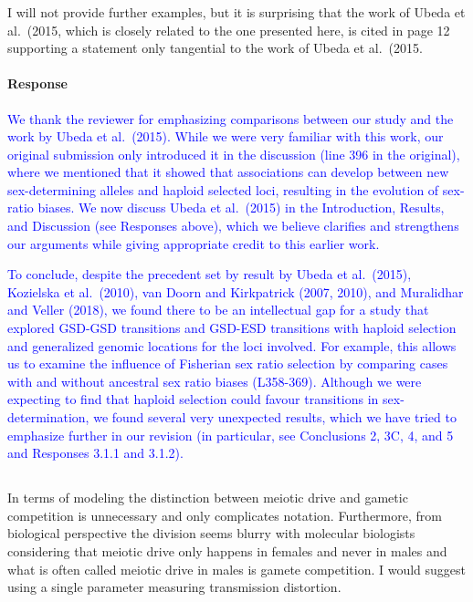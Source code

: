 \documentclass[10pt,letterpaper]{article}
\begin{document}
\noindent\subsubsection{}
I will not provide further examples, but it is surprising that the work of Ubeda et al.\ (2015, which is closely related to the one presented here, is cited in page 12 supporting a statement only tangential to the work of Ubeda et al.\ (2015.

\noindent\paragraph{Response}
\textcolor{blue}{
We thank the reviewer for emphasizing comparisons between our study and the work by Ubeda et al.\ (2015). 
While we were very familiar with this work, our original submission only introduced it in the discussion (line 396 in the original), where we mentioned that it showed that associations can develop between new sex-determining alleles and haploid selected loci, resulting in the evolution of sex-ratio biases.
We now discuss Ubeda et al.\ (2015) in the Introduction, Results, and Discussion (see Responses above), which we believe clarifies and strengthens our arguments while giving appropriate credit to this earlier work.
}

\textcolor{blue}{To conclude, despite the precedent set by result by Ubeda et al.\ (2015), Kozielska et al.\ (2010), van Doorn and Kirkpatrick (2007, 2010), and Muralidhar and Veller (2018), we found there to be an intellectual gap for a study that explored GSD-GSD transitions and GSD-ESD transitions with haploid selection and generalized genomic locations for the loci involved. 
For example, this allows us to examine the influence of Fisherian sex ratio selection by comparing cases with and without ancestral sex ratio biases (L358-369). 
Although we were expecting to find that haploid selection could favour transitions in sex-determination, we found several very unexpected results, which we have tried to emphasize further in our revision (in particular, see Conclusions 2, 3C, 4, and 5 and Responses 3.1.1 and 3.1.2). 
}

\noindent\subsection{}
In terms of modeling the distinction between meiotic drive and gametic competition is unnecessary and only complicates notation. Furthermore, from biological perspective the division seems blurry with molecular biologists considering that meiotic drive only happens in females and never in males and what is often called meiotic drive in males is gamete competition. I would suggest using a single parameter measuring transmission distortion.
\end{document}
